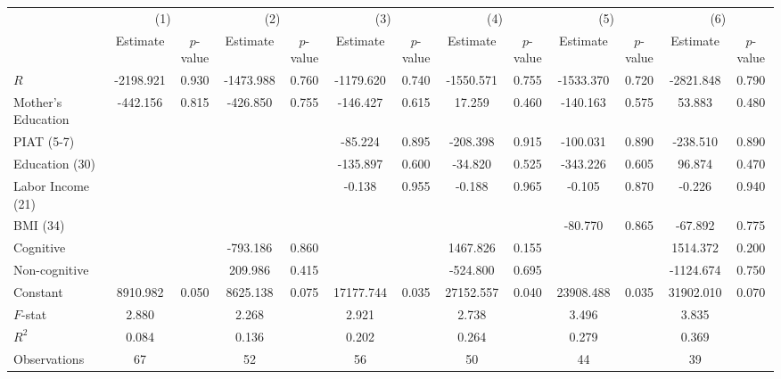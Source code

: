 \begin{table}[htbp]
\begin{tabular}{lcccccccccccc} \toprule
 & \multicolumn{2}{c}{(1)}  &  \multicolumn{2}{c}{(2)}  &  \multicolumn{2}{c}{(3)}  &  \multicolumn{2}{c}{(4)}  & \multicolumn{2}{c}{(5)} & \multicolumn{2}{c}{(6)} \\  
 & Estimate & $p$-value & Estimate & $p$-value & Estimate & $p$-value & Estimate & $p$-value & Estimate & $p$-value & Estimate & $p$-value \\ \midrule
$R$ & -2198.921 &     0.930 & -1473.988 &     0.760 & -1179.620 &     0.740 & -1550.571 &     0.755 & -1533.370 &     0.720 & -2821.848 &     0.790 \\  
Mother's Education &  -442.156 &     0.815 &  -426.850 &     0.755 &  -146.427 &     0.615 &    17.259 &     0.460 &  -140.163 &     0.575 &    53.883 &     0.480 \\  
PIAT (5-7) &         &         &         &         &   -85.224 &     0.895 &  -208.398 &     0.915 &  -100.031 &     0.890 &  -238.510 &     0.890 \\  
Education (30) &         &         &         &         &  -135.897 &     0.600 &   -34.820 &     0.525 &  -343.226 &     0.605 &    96.874 &     0.470 \\  
Labor Income (21) &         &         &         &         &    -0.138 &     0.955 &    -0.188 &     0.965 &    -0.105 &     0.870 &    -0.226 &     0.940 \\  
BMI (34) &         &         &         &         &         &         &         &         &   -80.770 &     0.865 &   -67.892 &     0.775 \\  
Cognitive &         &         &  -793.186 &     0.860 &         &         &  1467.826 &     0.155 &         &         &  1514.372 &     0.200 \\  
Non-cognitive &         &         &   209.986 &     0.415 &         &         &  -524.800 &     0.695 &         &         & -1124.674 &     0.750 \\  
Constant &  8910.982 &     0.050 &  8625.138 &     0.075 & 17177.744 &     0.035 & 27152.557 &     0.040 & 23908.488 &     0.035 & 31902.010 &     0.070 \\  \midrule
$F$-stat &     2.880 &         &     2.268 &         &     2.921 &         &     2.738 &         &     3.496 &         &     3.835 &         \\  
$R^2$ &     0.084 &         &     0.136 &         &     0.202 &         &     0.264 &         &     0.279 &         &     0.369 &         \\  
Observations &    67 &         &    52 &         &    56 &         &    50 &         &    44 &         &    39 &         \\  
\bottomrule \end{tabular}
\end{table}
